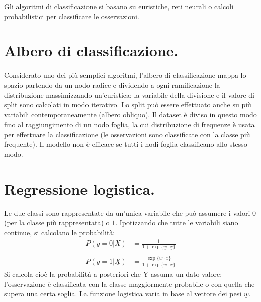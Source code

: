 \documentclass[11pt, a4page, twocolumn]{article}
\begin{document}
Gli algoritmi di classificazione si basano su euristiche, reti neurali o calcoli probabilistici per classificare le osservazioni.


\section{Albero di classificazione.}
Considerato uno dei più semplici algoritmi, l'albero di classificazione mappa lo spazio partendo da un nodo radice e dividendo a ogni ramificazione la distribuzione massimizzando un'euristica: la variabile della divisione e il valore di split sono calcolati in modo iterativo.
Lo split può essere effettuato anche su più variabili contemporaneamente (albero obliquo).
Il dataset è diviso in questo modo fino al raggiungimento di un nodo foglia, la cui distribuzione di frequenze è usata per effettuare la classificazione (le osservazioni sono classificate con la classe più frequente).
Il modello non è efficace se tutti i nodi foglia classificano allo stesso modo.


\section{Regressione logistica.}
Le due classi sono rappresentate da un'unica variabile che può assumere i valori $0$ (per la classe più rappresentata) o $1$.
Ipotizzando che tutte le variabili siano continue, si calcolano le probabilità:
\begin{align*}
P(y=0 | \underline{X}) &= \frac{1}{1 + \exp{\{\underline{w} \cdot \underline{x}\}}} \\ \\
P(y=1 | \underline{X}) &= \frac{\exp{\{\underline{w} \cdot \underline{x}\}}}{1 + \exp{\{\underline{w} \cdot \underline{x}\}}}
\end{align*}
Si calcola cioè la probabilità a posteriori che Y assuma un dato valore: l'osservazione è classificata con la classe maggiormente probabile o con quella che supera una certa soglia.
La funzione logistica varia in base al vettore dei pesi $\underline{w}$.
\end{document}
